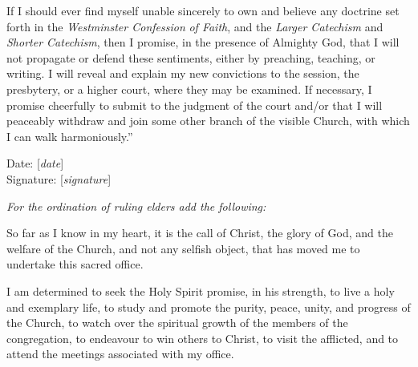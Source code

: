 \par If I should ever find myself unable sincerely to own and believe any doctrine set forth in the \textit{Westminster Confession}\textit{ of Faith}, and the \textit{Larger Catechism} and \textit{Shorter Catechism}, then I promise, in the presence of Almighty God, that I will not propagate or defend these sentiments, either by preaching, teaching, or writing. I will reveal and explain my new convictions to the session, the presbytery, or a higher court, where they may be examined. If necessary, I promise cheerfully to submit to the judgment of the court and/or that I will peaceably withdraw and join some other branch of the visible Church, with which I can walk harmoniously.''

\par Date: [\textit{date}]
\\Signature: [\textit{signature}]

\par\textit{For the ordination of ruling elders add the following:} 

\par So far as I know in my heart, it is the call of Christ, the glory of God, and the welfare of the Church, and not any selfish object, that has moved me to undertake this sacred office.

\par I am determined to seek the Holy Spirit promise, in his strength, to live a holy and exemplary life, to study and promote the purity, peace, unity, and progress of the Church, to watch over the spiritual growth of the members of the congregation, to endeavour to win others to Christ, to visit the afflicted, and to attend the meetings associated with my office.

